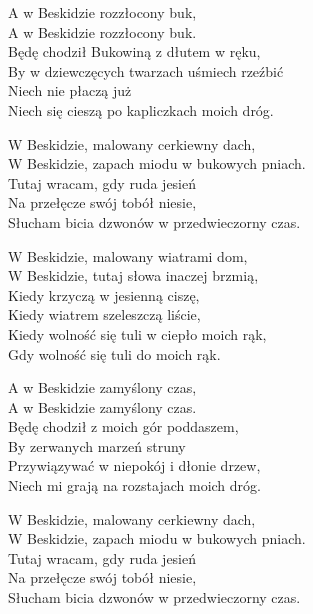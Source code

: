 
\begin{text}
    A w Beskidzie rozzłocony buk,\\
    A w Beskidzie rozzłocony buk.\\
    Będę chodził Bukowiną z dłutem w ręku,\\
    By w dziewczęcych twarzach uśmiech rzeźbić\\
    Niech nie płaczą już\\
    Niech się cieszą po kapliczkach moich dróg.

    W Beskidzie, malowany cerkiewny dach,\\
    W Beskidzie, zapach miodu w bukowych pniach.\\
    Tutaj wracam, gdy ruda jesień\\
    Na przełęcze swój tobół niesie,\\
    Słucham bicia dzwonów w przedwieczorny czas.

    W Beskidzie, malowany wiatrami dom,\\
    W Beskidzie, tutaj słowa inaczej brzmią,\\
    Kiedy krzyczą w jesienną ciszę,\\
    Kiedy wiatrem szeleszczą liście,\\
    Kiedy wolność się tuli w ciepło moich rąk,\\
    Gdy wolność się tuli do moich rąk.

    A w Beskidzie zamyślony czas,\\
    A w Beskidzie zamyślony czas.\\
    Będę chodził z moich gór poddaszem,\\
    By zerwanych marzeń struny\\
    Przywiązywać w niepokój i dłonie drzew,\\
    Niech mi grają na rozstajach moich dróg.

    W Beskidzie, malowany cerkiewny dach,\\
    W Beskidzie, zapach miodu w bukowych pniach.\\
    Tutaj wracam, gdy ruda jesień\\
    Na przełęcze swój tobół niesie,\\
    Słucham bicia dzwonów w przedwieczorny czas.
\end{text}
\begin{chord}

\end{chord}